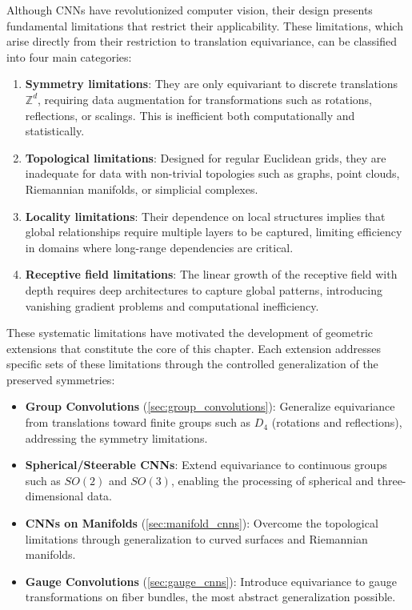 Although \glspl{CNN} have revolutionized computer vision, their design presents fundamental limitations that restrict their applicability. These limitations, which arise directly from their restriction to translation equivariance, can be classified into four main categories:

\begin{enumerate}
    \item \textbf{Symmetry limitations}: They are only equivariant to discrete translations $\mathbb{Z}^d$, requiring data augmentation for transformations such as rotations, reflections, or scalings. This is inefficient both computationally and statistically.

    \item \textbf{Topological limitations}: Designed for regular Euclidean grids, they are inadequate for data with non-trivial topologies such as graphs, point clouds, Riemannian manifolds, or simplicial complexes.

    \item \textbf{Locality limitations}: Their dependence on local structures implies that global relationships require multiple layers to be captured, limiting efficiency in domains where long-range dependencies are critical.

    \item \textbf{Receptive field limitations}: The linear growth of the receptive field with depth requires deep architectures to capture global patterns, introducing vanishing gradient problems and computational inefficiency.
\end{enumerate}

These systematic limitations have motivated the development of geometric extensions that constitute the core of this chapter. Each extension addresses specific sets of these limitations through the controlled generalization of the preserved symmetries:

\begin{itemize}
    \item \textbf{Group Convolutions} (\autoref{sec:group_convolutions}): Generalize equivariance from translations toward finite groups such as $D_4$ (rotations and reflections), addressing the symmetry limitations.
    \item \textbf{Spherical/Steerable \glspl{CNN}}: Extend equivariance to continuous groups such as $SO(2)$ and $SO(3)$, enabling the processing of spherical and three-dimensional data.
    \item \textbf{\glspl{CNN} on Manifolds} (\autoref{sec:manifold_cnns}): Overcome the topological limitations through generalization to curved surfaces and Riemannian manifolds.
    \item \textbf{Gauge Convolutions} (\autoref{sec:gauge_cnns}): Introduce equivariance to gauge transformations on fiber bundles, the most abstract generalization possible.
\end{itemize}

